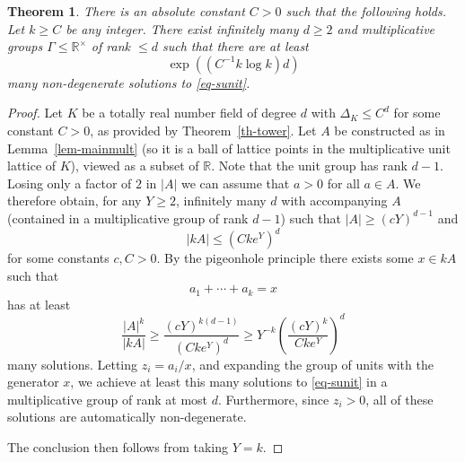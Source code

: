 \documentclass{amsart}
\numberwithin{equation}{section}
\newcommand{\abs}[1]{\mathopen{}\left| #1\mathclose{}\right|}
\newcommand{\bbr}{\mathbb{R}}
\newtheorem{theorem}{Theorem}[section]
\begin{document}
\begin{theorem}
There is an absolute constant $C>0$ such that the following holds. Let $k\geq C$ be any integer. There exist infinitely many $d\geq 2$ and multiplicative groups $\Gamma\leq\bbr^\times$ of rank $\leq d$ such that there are at least
\[\exp((C^{-1}k\log k)d)\]
many non-degenerate solutions to \eqref{eq-sunit}.
\end{theorem}
\begin{proof}
Let $K$ be a totally real number field of degree $d$ with $\Delta_K\leq C^d$ for some constant $C>0$, as provided by Theorem~\ref{th-tower}. Let $A$ be constructed as in Lemma~\ref{lem-mainmult} (so it is a ball of lattice points in the multiplicative unit lattice of $K$), viewed as a subset of $\bbr$. Note that the unit group has rank $d-1$. Losing only a factor of $2$ in $\abs{A}$ we can assume that $a>0$ for all $a\in A$. We therefore obtain, for any $Y\geq 2$, infinitely many $d$ with accompanying $A$ (contained in a multiplicative group of rank $d-1$) such that $\abs{A}\geq (cY)^{d-1}$ and
\[\abs{kA}\leq (Cke^Y)^d\]
for some constants $c,C>0$. By the pigeonhole principle there exists some $x\in kA$ such that
\[a_1+\cdots+a_k=x\]
has at least
\[\frac{\abs{A}^k}{\abs{kA}}\geq\frac{(cY)^{k(d-1)}}{(Cke^Y)^d}\geq Y^{-k}\left(\frac{(cY)^k}{Cke^Y}\right)^d\]
many solutions. Letting $z_i=a_i/x$, and expanding the group of units with the generator $x$, we achieve at least this many solutions to \eqref{eq-sunit} in a multiplicative group of rank at most $d$. Furthermore, since $z_i>0$, all of these solutions are automatically non-degenerate.

The conclusion then follows from taking $Y=k$.
\end{proof}
\end{document}
